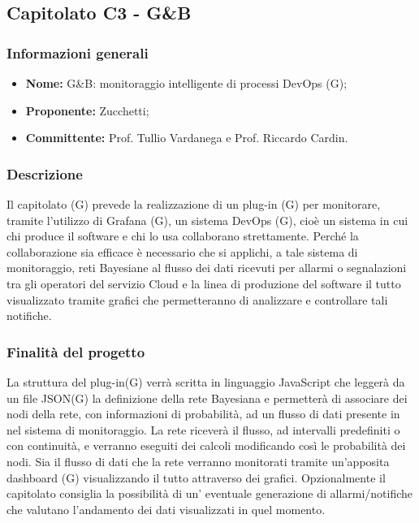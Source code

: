\subsection{Capitolato C3 - G\&B}
\subsubsection{Informazioni generali}
\begin{itemize}
	\item \textbf{Nome: }G\&B: monitoraggio intelligente di processi DevOps (G);
	\item \textbf{Proponente: }Zucchetti;
	\item \textbf{Committente: }Prof. Tullio Vardanega e Prof. Riccardo Cardin.
\end{itemize}
\subsubsection{Descrizione}
Il capitolato (G) prevede la realizzazione di un plug-in (G) per monitorare, tramite l'utilizzo di Grafana (G), un sistema 				DevOps (G), cioè un sistema in cui chi produce il software e chi lo usa collaborano strettamente. Perché la collaborazione 		sia efficace è necessario che si applichi, a tale sistema di monitoraggio, reti Bayesiane al flusso dei dati ricevuti per 				allarmi o segnalazioni tra gli operatori del servizio Cloud e la linea di produzione del software il tutto visualizzato tramite 				grafici che permetteranno di analizzare e controllare tali notifiche.
\subsubsection{Finalità del progetto}
La struttura del plug-in(G) verrà scritta in linguaggio JavaScript che leggerà da un file JSON(G) la definizione della rete 				Bayesiana e permetterà di associare dei nodi della rete, con informazioni di probabilità, ad un flusso di dati presente in 				nel sistema di monitoraggio. La rete riceverà il flusso, ad intervalli predefiniti o con continuità, e verranno eseguiti dei 				calcoli modificando così le probabilità dei nodi. Sia il flusso di dati che la rete verranno monitorati tramite un'apposita 				dashboard (G) visualizzando il tutto attraverso dei grafici. Opzionalmente il capitolato consiglia la possibilità di 					un' eventuale generazione di allarmi/notifiche che valutano l'andamento dei dati visualizzati in quel momento.
